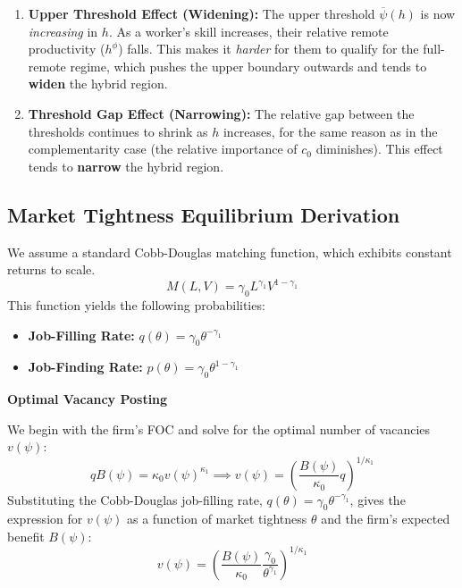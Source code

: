 \documentclass[
  11pt,
  letterpaper,
  DIV=11,
  numbers=noendperiod]{scrartcl}
\providecommand{\tightlist}{%
  \setlength{\itemsep}{0pt}\setlength{\parskip}{0pt}}\usepackage{longtable,booktabs,array}
\begin{document}
\begin{itemize}
\begin{itemize}
    \begin{enumerate}
    \def\labelenumi{\arabic{enumi}.}
    \tightlist
    \item
      \textbf{Upper Threshold Effect (Widening):} The upper threshold
      \(\overline{\psi}(h)\) is now \emph{increasing} in \(h\). As a
      worker's skill increases, their relative remote productivity
      (\(h^\phi\)) falls. This makes it \emph{harder} for them to
      qualify for the full-remote regime, which pushes the upper
      boundary outwards and tends to \textbf{widen} the hybrid region.
    \item
      \textbf{Threshold Gap Effect (Narrowing):} The relative gap
      between the thresholds continues to shrink as \(h\) increases, for
      the same reason as in the complementarity case (the relative
      importance of \(c_0\) diminishes). This effect tends to
      \textbf{narrow} the hybrid region.
    \end{enumerate}
  \end{itemize}
\end{itemize}

\subsection{Market Tightness Equilibrium
Derivation}\label{sec-appendix-cobb-douglas}

We assume a standard Cobb-Douglas matching function, which exhibits
constant returns to scale. \[
M(L, V) = \gamma_{0} L^{\gamma_{1}} V^{1-\gamma_{1}}
\] This function yields the following probabilities:

\begin{itemize}
\tightlist
\item
  \textbf{Job-Filling Rate:}
  \(q(\theta) = \gamma_{0} \theta^{-\gamma_{1}}\)
\item
  \textbf{Job-Finding Rate:}
  \(p(\theta) = \gamma_{0} \theta^{1-\gamma_{1}}\)
\end{itemize}

\textbf{Optimal Vacancy Posting}

We begin with the firm's FOC and solve for the optimal number of
vacancies \(v(\psi)\): \[
q B(\psi) = \kappa_{0} v(\psi)^{\kappa_{1}} \implies v(\psi) = \left( \frac{B(\psi)}{\kappa_{0}} q \right)^{1/\kappa_{1}}
\] Substituting the Cobb-Douglas job-filling rate,
\(q(\theta) = \gamma_{0} \theta^{-\gamma_{1}}\), gives the expression
for \(v(\psi)\) as a function of market tightness \(\theta\) and the
firm's expected benefit \(B(\psi)\): \[
v(\psi) = \left( \frac{B(\psi)}{\kappa_{0}} \frac{\gamma_{0}}{\theta^{\gamma_{1}}} \right)^{1/\kappa_{1}}
\]
\end{document}
